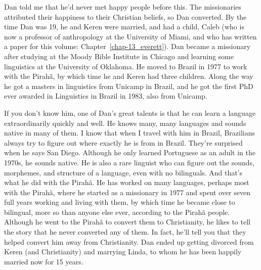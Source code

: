 \begin{refsection}
Dan told me that he'd never met happy people before this. The missionaries attributed their happiness to their Christian beliefs, so Dan converted. By the time Dan was 19, he and Keren were married, and had a child, Caleb (who is now a professor of anthropology at the University of Miami, and who has written a paper for this volume: Chapter~\ref{chap-13_everett}). Dan became a missionary after studying at the Moody Bible Institute in Chicago and learning some linguistics at the University of Oklahoma. He moved to Brazil in 1977 to work with the Pirahã, by which time he and Keren had three children. Along the way he got a masters in linguistics from Unicamp in Brazil, and he got the first PhD ever awarded in Linguistics in Brazil in 1983, also from Unicamp. 

If you don't know him, one of Dan's great talents is that he can learn a language extraordinarily quickly and well. He knows many, many languages and sounds native in many of them. I know that when I travel with him in Brazil, Brazilians always try to figure out where exactly he is from in Brazil. They're surprised when he says San Diego. Although he only learned Portuguese as an adult in the 1970s, he sounds native. He is also a rare linguist who can figure out the sounds, morphemes, and structure of a language, even with no bilinguals. And that's what he did with the Pirahã. He has worked on many languages, perhaps most with the Pirahã, where he started as a missionary in 1977 and spent over seven full years working and living with them, by which time he became close to bilingual, more so than anyone else ever, according to the Pirahã people. Although he went to the Pirahã to convert them to Christianity, he likes to tell the story that he never converted any of them. In fact, he'll tell you that they helped convert him away from Christianity. Dan ended up getting divorced from Keren (and Christianity) and marrying Linda, to whom he has been happily married now for 15 years. 


\end{refsection}
